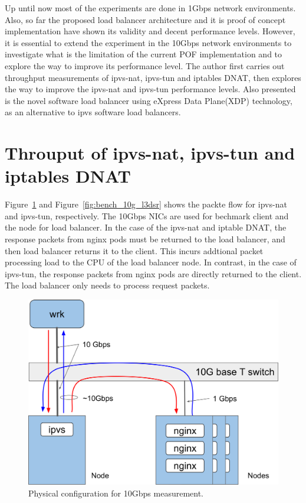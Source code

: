 Up until now most of the experiments are done in 1Gbps network environments.
Also, so far the proposed load balancer architecture and it is proof of concept implementation have shown its validity and decent performance levels.
However, it is essential to extend the experiment in the 10Gbps network environments to investigate what is the limitation of the current POF implementation and to explore the way to improve its performance level.
The author first carries out throughput measurements of ipvs-nat, ipvs-tun and iptables DNAT, then explores the way to improve the ipvs-nat and ipvs-tun performance levels.
Also presented is the novel software load balancer using eXpress Data Plane(XDP) technology, as an alternative to ipvs software load balancers.

\section{Throuput of ipvs-nat, ipvs-tun and iptables DNAT}

Figure~\ref{fig:bench_10g} and Figure~\ref{fig:bench_10g_l3dsr} shows the packte flow for ipvs-nat and ipvs-tun, respectively.
The 10Gbps NICs are used for bechmark client and the node for load balancer.
In the case of the ipvs-nat and iptable DNAT, the response packets from nginx pods must be returned to the load balancer, and then load balancer returns it to the client.
This incurs addtional packet processing load to the CPU of the load balancer node.
In contrast, in the case of ipvs-tun, the response packets from nginx pods are directly returned to the client.
The load balancer only needs to process request packets.

\begin{figure}[h]
  \centering
  \includegraphics[width=0.8\columnwidth]{Figs/bench_10g}
  \caption{Physical configuration for 10Gbps measurement.}
  \label{fig:bench_10g}
\end{figure}

